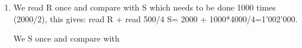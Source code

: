 \documentclass[12pt]{extarticle}
\begin{document}
\begin{flushleft}
\begin{enumerate}[label=\textbf{\Alph*.}]
\begin{enumerate}[label=\arabic*)]
\end{enumerate}

\item We read R once and compare with S which needs to be done 1000 times (2000/2), this gives: read R + read 500/4 S= 2000 + 1000*4000/4=1'002'000.

We S once and compare with 
\end{enumerate}
\end{flushleft}
\end{document}
